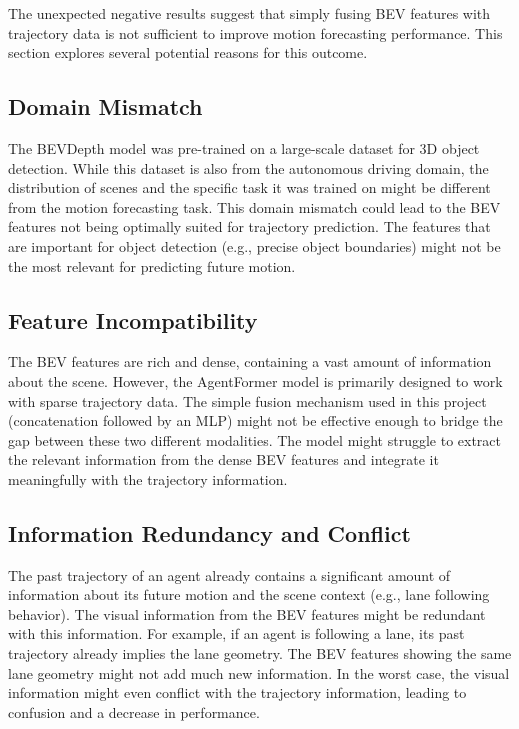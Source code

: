 The unexpected negative results suggest that simply fusing BEV features with trajectory data is not sufficient to improve motion forecasting performance. This section explores several potential reasons for this outcome.

\subsection{Domain Mismatch}

The BEVDepth model was pre-trained on a large-scale dataset for 3D object detection. While this dataset is also from the autonomous driving domain, the distribution of scenes and the specific task it was trained on might be different from the motion forecasting task. This domain mismatch could lead to the BEV features not being optimally suited for trajectory prediction. The features that are important for object detection (e.g., precise object boundaries) might not be the most relevant for predicting future motion.

\subsection{Feature Incompatibility}

The BEV features are rich and dense, containing a vast amount of information about the scene. However, the AgentFormer model is primarily designed to work with sparse trajectory data. The simple fusion mechanism used in this project (concatenation followed by an MLP) might not be effective enough to bridge the gap between these two different modalities. The model might struggle to extract the relevant information from the dense BEV features and integrate it meaningfully with the trajectory information.

\subsection{Information Redundancy and Conflict}

The past trajectory of an agent already contains a significant amount of information about its future motion and the scene context (e.g., lane following behavior). The visual information from the BEV features might be redundant with this information. For example, if an agent is following a lane, its past trajectory already implies the lane geometry. The BEV features showing the same lane geometry might not add much new information. In the worst case, the visual information might even conflict with the trajectory information, leading to confusion and a decrease in performance.

